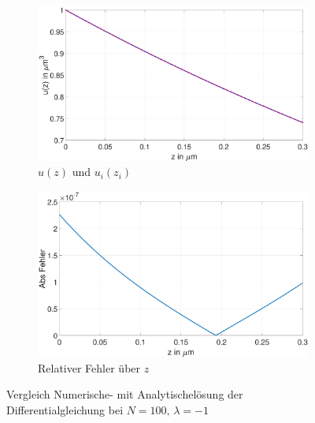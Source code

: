  \begin{figure}[p]
 	\begin{subfigure}[b]{0.5\textwidth}
 		\includegraphics[width=\textwidth]{figures/station_gl_2_1/test_n100}
		\caption{$u(z)$ und $u_{i}(z_i)$}
 	  \end{subfigure}
 	\hfill
 \begin{subfigure}[b]{0.5\textwidth}
 	\includegraphics[width=1\linewidth]{figures/station_gl_2_1/test_n100_fehler}
 	\caption{Relativer Fehler über $z$}
  \end{subfigure}
\caption{Vergleich Numerische- mit Analytischelösung der Differentialgleichung bei $N=100,\,\lambda=-1$}
 	\label{fig:testn10}
 \end{figure}

